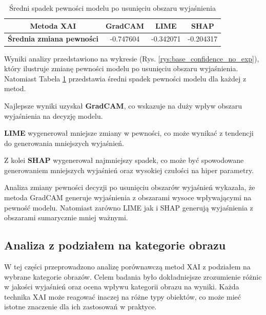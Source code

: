\begin{table}[h]
	\centering
	\begin{tabular}{|c|c|c|c|}
		\hline
		\textbf{Metoda XAI}              & \textbf{GradCAM} & \textbf{LIME} & \textbf{SHAP} \\
		\hline
		\textbf{Średnia zmiana pewności} & -0.747604        & -0.342071     & -0.204317     \\
		\hline
	\end{tabular}
	\caption{Średni spadek pewności modelu po usunięciu obszaru wyjaśnienia}
	\label{tab:base_confidence_no_exp}
\end{table}

Wyniki analizy przedstawiono na wykresie (Rys. \ref{rys:base_confidence_no_exp}), który ilustruje zmianę pewności modelu po usunięciu obszaru wyjaśnienia.
Natomiast Tabela \ref{tab:base_confidence_no_exp} przedstawia średni spadek pewności modelu dla każdej z metod.

Najlepsze wyniki uzyskał \textbf{GradCAM}, co wskazuje na duży wpływ obszaru wyjaśnienia na decyzję modelu.

\textbf{LIME} wygenerował mniejsze zmiany w pewności, co może wynikać z tendencji do generowania mniejszych wyjaśnień.

Z kolei \textbf{SHAP} wygenerował najmniejszy spadek, co może być spowodowane generowaniem mniejszych wyjaśnień oraz wysokiej czułości na hiper parametry.

Analiza zmiany pewności decyzji po usunięciu obszarów wyjaśnień wykazała, że metoda GradCAM generuje wyjaśnienia z obszarami wysoce wpływającymi na pewność modelu.
Natomiast zarówno LIME jak i SHAP generują wyjaśnienia z obszarami sumarycznie mniej ważnymi.

\subsection*{Analiza z podziałem na kategorie obrazu}

W tej części przeprowadzono analizę porównawczą metod XAI z podziałem na wybrane kategorie obrazów.
Celem badania było dokładniejsze zrozumienie różnic w jakości wyjaśnień oraz ocena wpływu kategorii obrazu na wyniki.
Każda technika XAI może reagować inaczej na różne typy obiektów, co może mieć istotne znaczenie dla ich zastosowań w praktyce.

